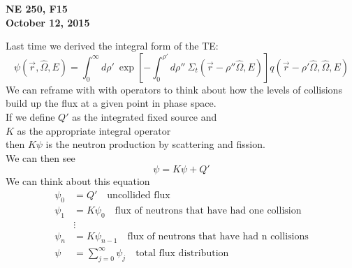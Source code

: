 \documentclass[12pt]{article}
\newcommand{\rvec}{\ensuremath{\vec{r}}}
\newcommand{\vOmega}{\ensuremath{\hat{\Omega}}}
\begin{document}
\begin{center}
{\bf NE 250, F15\\
October 12, 2015 
}
\end{center}

Last time we derived the integral form of the TE:
\begin{equation}
\psi(\rvec, \vOmega, E) =\int_0^{\infty} d\rho' \:\exp[-\int_0^{\rho'} d\rho'' \: \Sigma_t(\rvec-\rho''\vOmega,E)]q(\rvec-\rho'\vOmega,\vOmega,E)
\label{eq:integral}
\end{equation}
%
We can reframe with with operators to think about how the levels of collisions build up the flux at a given point in phase space.\\
If we define $Q'$ as the integrated fixed source and\\
$K$ as the appropriate integral operator \\
then $K\psi$ is the neutron production by scattering and fission. \\
We can then see
\[\psi = K \psi + Q'\]
We can think about this equation 
\begin{align*}
\psi_0 &= Q' \quad \text{uncollided flux}\\
\psi_1 &= K \psi_0 \quad \text{flux of neutrons that have had one collision}\\
&\vdots \\
\psi_n &= K \psi_{n-1} \quad \text{flux of neutrons that have had n collisions} \\
\psi &= \sum_{j=0}^{\infty} \psi_j \quad \text{total flux distribution}
\end{align*}
\end{document}
